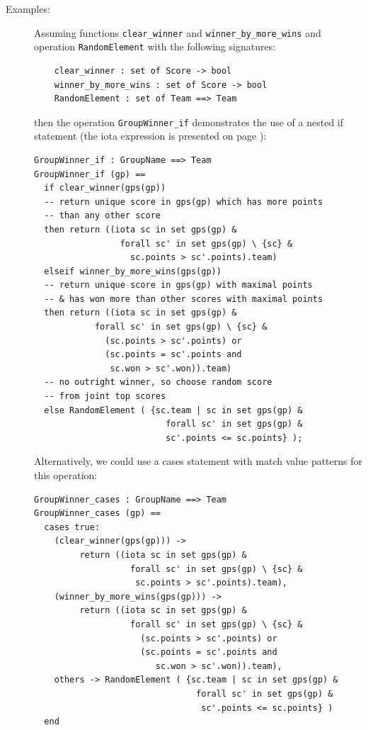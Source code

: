 \documentclass{overturerepchap}
\begin{document}
\begin{description}
\item[Examples:] Assuming functions \texttt{clear\_winner} and 
  \texttt{winner\_by\_more\_wins} and operation \texttt{RandomElement} 
  with the following signatures:
  \begin{lstlisting}
    clear_winner : set of Score -> bool
    winner_by_more_wins : set of Score -> bool
    RandomElement : set of Team ==> Team
  \end{lstlisting}
  then the operation \texttt{GroupWinner\_if} demonstrates the use of a 
  nested if statement (the iota expression is presented on page 
  \pageref{iotaexpr}):
  \begin{lstlisting}
GroupWinner_if : GroupName ==> Team
GroupWinner_if (gp) ==
  if clear_winner(gps(gp))
  -- return unique score in gps(gp) which has more points
  -- than any other score
  then return ((iota sc in set gps(gp) &
                 forall sc' in set gps(gp) \ {sc} &
                   sc.points > sc'.points).team)
  elseif winner_by_more_wins(gps(gp))
  -- return unique score in gps(gp) with maximal points
  -- & has won more than other scores with maximal points
  then return ((iota sc in set gps(gp) &
            forall sc' in set gps(gp) \ {sc} &
              (sc.points > sc'.points) or
              (sc.points = sc'.points and 
               sc.won > sc'.won)).team)
  -- no outright winner, so choose random score 
  -- from joint top scores
  else RandomElement ( {sc.team | sc in set gps(gp) &
                          forall sc' in set gps(gp) &
                          sc'.points <= sc.points} );
  \end{lstlisting}
  Alternatively, we could use a cases statement with match value patterns for
  this operation: 
  \begin{lstlisting}
GroupWinner_cases : GroupName ==> Team
GroupWinner_cases (gp) ==
  cases true:
    (clear_winner(gps(gp))) -> 
         return ((iota sc in set gps(gp) &
                   forall sc' in set gps(gp) \ {sc} &
                    sc.points > sc'.points).team),
    (winner_by_more_wins(gps(gp))) ->
         return ((iota sc in set gps(gp) &
                   forall sc' in set gps(gp) \ {sc} &
                     (sc.points > sc'.points) or
                     (sc.points = sc'.points and 
                        sc.won > sc'.won)).team),
    others -> RandomElement ( {sc.team | sc in set gps(gp) &
                                forall sc' in set gps(gp) &
                                 sc'.points <= sc.points} )
  end
  \end{lstlisting}

\end{description}
\end{document}

